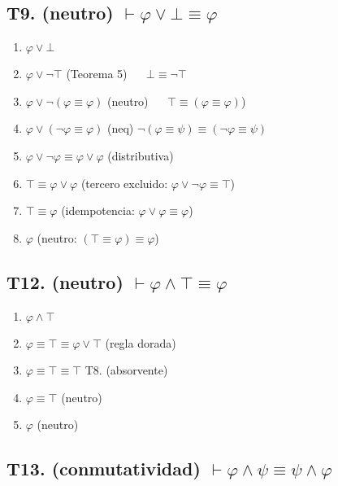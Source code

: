 \documentclass[a4paper,11pt]{article}
\begin{document}
\newpage

\subsection{T9. (neutro) $\vdash \varphi \lor \bot \equiv \varphi$}

\begin{enumerate}
    \item $\varphi \lor \bot$
    \item $\varphi \lor \neg \top$ \hfill (Teorema 5) ~~ $\bot \equiv \neg \top$
    \item $\varphi \lor \neg (\varphi \equiv \varphi)$ \hfill (neutro) ~~ $\top \equiv (\varphi \equiv \varphi)$)
    \item $\varphi \lor (\neg \varphi \equiv \varphi)$ \hfill (neq) $\neg (\varphi \equiv \psi) \equiv (\neg\varphi \equiv \psi)$
    \item $\varphi \lor \neg \varphi \equiv \varphi \lor \varphi$ \hfill (distributiva)
    \item $\top \equiv \varphi \lor \varphi$ \hfill (tercero excluido: $\varphi \lor \neg \varphi \equiv \top$)
    \item $\top \equiv \varphi$ \hfill (idempotencia: $\varphi \lor \varphi \equiv \varphi$)
    \item $\varphi$ \hfill (neutro: $(\top \equiv \varphi) \equiv \varphi$)
\end{enumerate}

\subsection{T12. (neutro) $\vdash \varphi \land \top \equiv \varphi$}

\begin{enumerate}
    \item $\varphi \land \top$
    \item $\varphi \equiv \top \equiv \varphi \lor \top$ \hfill (regla dorada)
    \item $\varphi \equiv \top \equiv \top$ \hfill T8. (absorvente)
    \item $\varphi \equiv \top$ \hfill (neutro)
    \item $\varphi$ \hfill (neutro)
\end{enumerate}

\subsection{T13. (conmutatividad) $\vdash \varphi \land \psi \equiv \psi \land \varphi$}
\end{document}
